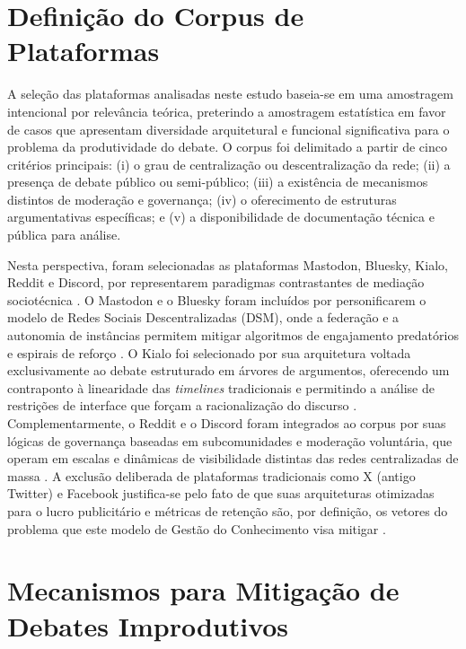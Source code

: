 \documentclass[conference]{IEEEtran} \IEEEoverridecommandlockouts %
\begin{document}
\section{Definição do Corpus de Plataformas}

A seleção das plataformas analisadas neste estudo baseia-se em uma amostragem intencional por relevância teórica, preterindo a amostragem estatística em favor de casos que apresentam diversidade arquitetural e funcional significativa para o problema da produtividade do debate. O corpus foi delimitado a partir de cinco critérios principais: (i) o grau de centralização ou descentralização da rede; (ii) a presença de debate público ou semi-público; (iii) a existência de mecanismos distintos de moderação e governança; (iv) o oferecimento de estruturas argumentativas específicas; e (v) a disponibilidade de documentação técnica e pública para análise.


Nesta perspectiva, foram selecionadas as plataformas Mastodon, Bluesky, Kialo, Reddit e Discord, por representarem paradigmas contrastantes de mediação sociotécnica \cite{schneider2026mitigating}. O Mastodon e o Bluesky foram incluídos por personificarem o modelo de Redes Sociais Descentralizadas (DSM), onde a federação e a autonomia de instâncias permitem mitigar algoritmos de engajamento predatórios e espirais de reforço \cite{jeongNavigatingDecentralizedOnline2025}. O Kialo foi selecionado por sua arquitetura voltada exclusivamente ao debate estruturado em árvores de argumentos, oferecendo um contraponto à linearidade das \textit{timelines} tradicionais e permitindo a análise de restrições de interface que forçam a racionalização do discurso \cite{schneider2026mitigating}. Complementarmente, o Reddit e o Discord foram integrados ao corpus por suas lógicas de governança baseadas em subcomunidades e moderação voluntária, que operam em escalas e dinâmicas de visibilidade distintas das redes centralizadas de massa \cite{schneider2026mitigating}. A exclusão deliberada de plataformas tradicionais como X (antigo Twitter) e Facebook justifica-se pelo fato de que suas arquiteturas otimizadas para o lucro publicitário e métricas de retenção são, por definição, os vetores do problema que este modelo de Gestão do Conhecimento visa mitigar \cite{pimentelAgendaSolutionsMitigate2023, schneider2026mitigating}.



\section{Mecanismos para Mitigação de Debates Improdutivos}
\end{document}
